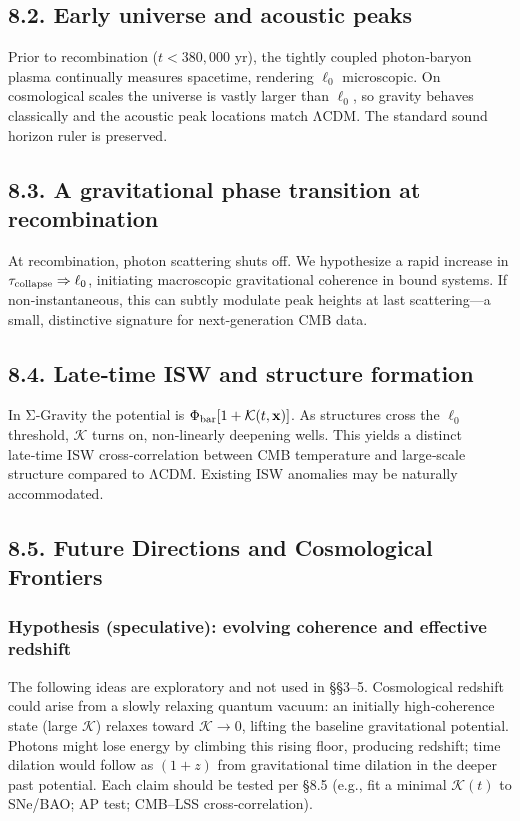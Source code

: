 \documentclass[11pt,a4paper]{article}
\begin{document}
\subsection{8.2. Early universe and acoustic peaks}


Prior to recombination ($t<380{,}000$ yr), the tightly coupled photon‑baryon plasma continually measures spacetime, rendering $\ell_0$ microscopic. On cosmological scales the universe is vastly larger than $\ell_0$, so gravity behaves classically and the acoustic peak locations match ΛCDM. The standard sound horizon ruler is preserved.


\subsection{8.3. A gravitational phase transition at recombination}


At recombination, photon scattering shuts off. We hypothesize a rapid increase in $\tau_{\rm collapse}\Rightarrow\ell_0$, initiating macroscopic gravitational coherence in bound systems. If non‑instantaneous, this can subtly modulate peak heights at last scattering—a small, distinctive signature for next‑generation CMB data.


\subsection{8.4. Late‑time ISW and structure formation}


In Σ‑Gravity the potential is $\Phi_{\rm bar}[1+\mathcal{K}(t,\mathbf{x})]$. As structures cross the $\ell_0$ threshold, $\mathcal{K}$ turns on, non‑linearly deepening wells. This yields a distinct late‑time ISW cross‑correlation between CMB temperature and large‑scale structure compared to ΛCDM. Existing ISW anomalies may be naturally accommodated.


\subsection{8.5. Future Directions and Cosmological Frontiers}


\subsubsection{Hypothesis (speculative): evolving coherence and effective redshift}


The following ideas are exploratory and not used in §§3–5. Cosmological redshift could arise from a slowly relaxing quantum vacuum: an initially high‑coherence state (large $\mathcal{K}$) relaxes toward $\mathcal{K}\to0$, lifting the baseline gravitational potential. Photons might lose energy by climbing this rising floor, producing redshift; time dilation would follow as $(1+z)$ from gravitational time dilation in the deeper past potential. Each claim should be tested per §8.5 (e.g., fit a minimal $\mathcal{K}(t)$ to SNe/BAO; AP test; CMB–LSS cross‑correlation).
\end{document}
